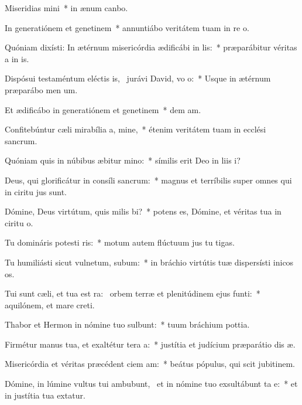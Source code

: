 \item Miseridias mini~* in ænum canbo.
\item In generatiónem et genetinem~* annuntiábo veritátem tuam in re o.
\item Quóniam dixísti: In ætérnum misericórdia ædificábi in lis:~* præparábitur véritas a in is.
\item Dispósui testaméntum eléctis is,~\pscross{} jurávi David, vo o:~* Usque in ætérnum præparábo men um.
\item Et ædificábo in generatiónem et genetinem~* dem am.
\item Confitebúntur cæli mirabília a, mine,~* étenim veritátem tuam in ecclési sancrum.
\item Quóniam quis in núbibus æbitur mino:~* símilis erit Deo in liis i?
\item Deus, qui glorificátur in consíli sancrum:~* magnus et terríbilis super omnes qui in ciritu jus sunt.
\item Dómine, Deus virtútum, quis milis bi?~* potens es, Dómine, et véritas tua in ciritu o.
\item Tu domináris potesti ris:~* motum autem flúctuum jus tu tigas.
\item Tu humiliásti sicut vulnetum, subum:~* in bráchio virtútis tuæ dispersísti inicos os.
\item Tui sunt cæli, et tua est ra:~\pscross{} orbem terræ et plenitúdinem ejus  funti:~* aquilónem, et mare  creti.
\item Thabor et Hermon in nómine tuo sulbunt:~* tuum bráchium  pottia.
\item Firmétur manus tua, et exaltétur tera a:~* justítia et judícium præparátio dis æ.
\item Misericórdia et véritas præcédent ciem am:~* beátus pópulus, qui scit jubitinem.
\item Dómine, in lúmine vultus tui ambubunt,~\pscross{} et in nómine tuo exsultábunt ta e:~* et in justítia tua extatur.
